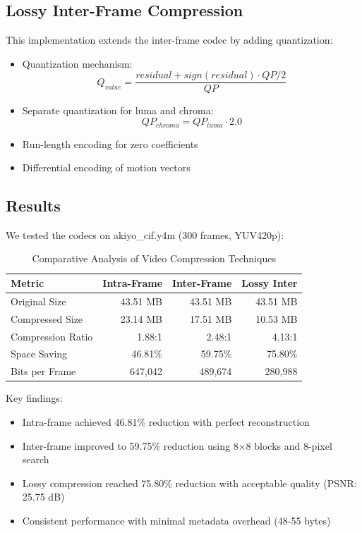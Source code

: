 \documentclass[a4paper,14pt]{article}
\begin{document}
\subsection{Lossy Inter-Frame Compression}
This implementation extends the inter-frame codec by adding quantization:
\begin{itemize}
    \item Quantization mechanism:
    \begin{equation}
        Q_{value} = \frac{residual + sign(residual) \cdot QP/2}{QP}
    \end{equation}
    \item Separate quantization for luma and chroma:
    \begin{equation}
        QP_{chroma} = QP_{luma} \cdot 2.0
    \end{equation}
    \item Run-length encoding for zero coefficients
    \item Differential encoding of motion vectors
\end{itemize}

\subsection{Results}
We tested the codecs on akiyo\_cif.y4m (300 frames, YUV420p):

\begin{table}[H]
\centering
\begin{tabular}{|l|r|r|r|}
\hline
\textbf{Metric} & \textbf{Intra-Frame} & \textbf{Inter-Frame} & \textbf{Lossy Inter} \\
\hline
Original Size & 43.51 MB & 43.51 MB & 43.51 MB \\
Compressed Size & 23.14 MB & 17.51 MB & 10.53 MB \\
Compression Ratio & 1.88:1 & 2.48:1 & 4.13:1 \\
Space Saving & 46.81\% & 59.75\% & 75.80\% \\
Bits per Frame & 647,042 & 489,674 & 280,988 \\
\hline
\end{tabular}
\caption{Comparative Analysis of Video Compression Techniques}
\label{tab:compression_metrics}
\end{table}

Key findings:
\begin{itemize}
    \item Intra-frame achieved 46.81\% reduction with perfect reconstruction
    \item Inter-frame improved to 59.75\% reduction using 8×8 blocks and 8-pixel search
    \item Lossy compression reached 75.80\% reduction with acceptable quality (PSNR: 25.75 dB)
    \item Consistent performance with minimal metadata overhead (48-55 bytes)
\end{itemize}
\end{document}
